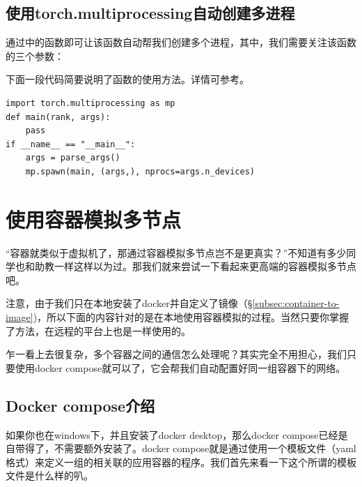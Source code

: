 \subsection{使用torch.multiprocessing自动创建多进程}

通过中的函数即可让该函数自动帮我们创建多个进程，其中，我们需要关注该函数的三个参数：

下面一段代码简要说明了函数的使用方法。详情可参考。
\begin{lstlisting}
import torch.multiprocessing as mp
def main(rank, args):
    pass
if __name__ == "__main__":
    args = parse_args()
    mp.spawn(main, (args,), nprocs=args.n_devices)
\end{lstlisting}

\section{使用容器模拟多节点}

“容器就类似于虚拟机了，那通过容器模拟多节点岂不是更真实？”不知道有多少同学也和助教一样这样以为过。那我们就来尝试一下看起来更高端的容器模拟多节点吧。

注意，由于我们只在本地安装了docker并自定义了镜像（\S\ref{subsec:container-to-image})，所以下面的内容针对的是在本地使用容器模拟的过程。当然只要你掌握了方法，在远程的平台上也是一样使用的。

乍一看上去很复杂，多个容器之间的通信怎么处理呢？其实完全不用担心，我们只要使用docker compose就可以了，它会帮我们自动配置好同一组容器下的网络。

\subsection{Docker compose介绍}

如果你也在windows下，并且安装了docker desktop，那么docker compose已经是自带得了，不需要额外安装了。docker compose就是通过使用一个模板文件（yaml格式）来定义一组的相关联的应用容器的程序。我们首先来看一下这个所谓的模板文件是什么样的叭。

